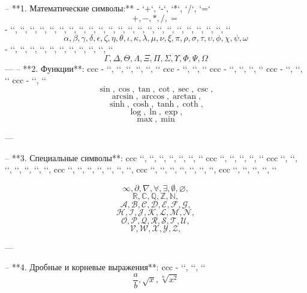 --   **1. Математические символы:**
   - `+`, `-`, `*`, `/`, `=`
 \[
     {+} ,  {-} ,  {* },  {/} ,  {=} 
 \]
   - `\alpha`, `\beta`, `\gamma`, `\delta`, `\epsilon`, `\zeta`, `\eta`, `\theta`, `\iota`, `\kappa`, `\lambda`, `\mu`, `\nu`, `\xi`, `\pi`, `\rho`, `\sigma`, `\tau`, `\upsilon`, `\phi`, `\chi`, `\psi`, `\omega`
 \[
     {\alpha}, {\beta}, {\gamma}, {\delta}, {\epsilon}, {\zeta}, {\eta}, {\theta}, {\iota}, {\kappa}, {\lambda}, {\mu}, {\nu}, {\xi}, {\pi}, {\rho}, {\sigma}, {\tau}, {\upsilon}, {\phi}, {\chi}, {\psi}, {\omega}
 \]
   - `\Gamma`, `\Delta`, `\Theta`, `\Lambda`, `\Xi`, `\Pi`, `\Sigma`, `\Upsilon`, `\Phi`, `\Psi`, `\Omega`
\[   
      {\Gamma}, {\Delta}, {\Theta}, {\Lambda}, {\Xi}, {\Pi}, {\Sigma}, {\Upsilon}, {\Phi}, {\Psi}, {\Omega}
\]
---
--  **2. Функции**:
 ccc  - `\sin`, `\cos`, `\tan`, `\cot`, `\sec`, `\csc`
 ccc   - `\arcsin`, `\arccos`, `\arctan`
 ccc  - `\sinh`, `\cosh`, `\tanh`, `\coth`
 ccc  - `\log`, `\ln`, `\exp`
 ccc  - `\max`, `\min`
\[ {\sin}, {\cos}, {\tan}, {\cot}, {\sec}, {\csc},\]
\[   {\arcsin}, {\arccos}, {\arctan},\]
\[   {\sinh}, {\cosh}, {\tanh}, {\coth},\]
\[    {\log}, {\ln}, {\exp},\]
\[   {\max}, {\min}\]
   
---

-- **3. Специальные символы**:
ccc     `\infty`, `\partial`, `\nabla`, `\forall`, `\exists`, `\emptyset`, `\varnothing`
ccc     ``, ``, ``, ``, ``
ccc    ``, ``, ``, ``, ``, ``, ``, 
ccc    ``, ``, ``, ``, ``, ``, ``, 
ccc    ``, ``, ``, ``, ``, ``, ``, 
ccc    ``, ``, ``, ``, ``

\[{\infty}, {\partial}, {\nabla}, {\forall}, {\exists}, {\emptyset}, {\varnothing},\]
\[{\mathbb{R}}, {\mathbb{C}}, {\mathbb{Q}}, {\mathbb{Z}}, {\mathbb{N}},\]
\[{\mathcal{A}}, {\mathcal{B}}, {\mathcal{C}}, {\mathcal{D}}, {\mathcal{E}}, {\mathcal{F}}, {\mathcal{G}}, \]
\[{\mathcal{H}}, {\mathcal{I}}, {\mathcal{J}}, {\mathcal{K}}, {\mathcal{L}}, {\mathcal{M}}, {\mathcal{N}}, \]
\[{\mathcal{O}}, {\mathcal{P}}, {\mathcal{Q}}, {\mathcal{R}}, {\mathcal{S}}, {\mathcal{T}}, {\mathcal{U}}, \]
\[{\mathcal{V}}, {\mathcal{W}}, {\mathcal{X}}, {\mathcal{Y}}, {\mathcal{Z}},\]

---  
 

--  **4. Дробные и корневые выражения**:
ccc   - ``,  ``, ``
\[ \frac{a}{b},  \sqrt{x}, \sqrt[n]{x^2}\]

